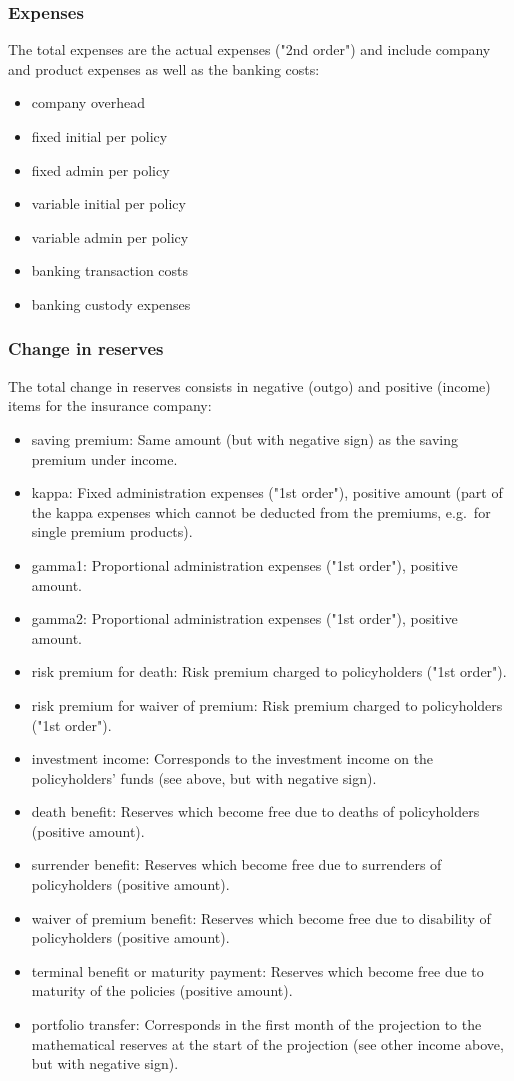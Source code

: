 \subsubsection{Expenses}
The total expenses are the actual expenses ("2nd order") and include company and product expenses as well as the banking costs:
\begin{itemize}
	\item company overhead
	\item fixed initial per policy
	\item fixed admin per policy
	\item variable initial per policy
	\item variable admin per policy
	\item banking transaction costs
	\item banking custody expenses
\end{itemize}

\subsubsection{Change in reserves}
The total change in reserves consists in negative (outgo) and positive (income) items for the insurance company:
\begin{itemize}
	\item saving premium: Same amount (but with negative sign) as the saving premium under income.
	\item kappa: Fixed administration expenses ("1st order"), positive amount (part of the kappa expenses which cannot be deducted from the premiums, e.g.~for single premium products).
	\item gamma1: Proportional administration expenses ("1st order"), positive amount.
	\item gamma2: Proportional administration expenses ("1st order"), positive amount.
	\item risk premium for death: Risk premium charged to policyholders ("1st order").
	\item risk premium for waiver of premium: Risk premium charged to policyholders ("1st order").
	\item investment income: Corresponds to the investment income on the policyholders' funds (see above, but with negative sign).
	\item death benefit: Reserves which become free due to deaths of policyholders (positive amount).
	\item surrender benefit: Reserves which become free due to surrenders of policyholders (positive amount).
	\item waiver of premium benefit: Reserves which become free due to disability of policyholders (positive amount).
	\item terminal benefit or maturity payment: Reserves which become free due to maturity of the policies (positive amount).
	\item portfolio transfer: Corresponds in the first month of the projection to the mathematical reserves at the start of the projection (see other income above, but with negative sign).
\end{itemize}

